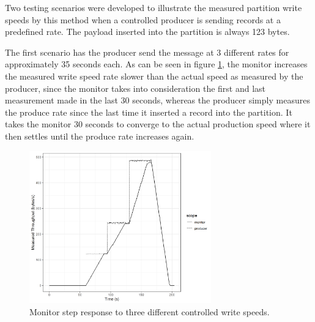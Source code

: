 Two testing scenarios were developed to illustrate the measured partition write
speeds by this method when a controlled producer is sending records at a
predefined rate. The payload inserted into the partition is always 123 bytes.

The first scenario has the producer send the message at 3 different rates for
approximately 35 seconds each. As can be seen in figure \ref{fig:monitor_step},
the monitor increases the measured write speed rate slower than the actual speed
as measured by the producer, since the monitor takes into consideration the
first and last measurement made in the last 30 seconds, whereas the producer
simply measures the produce rate since the last time it inserted a record into
the partition. It takes the monitor 30 seconds to converge to the actual
production speed where it then settles until the produce rate increases again.

\begin{figure}[htb!] 
    \centering
    \includegraphics[width=0.7\textwidth]{images/monitor/step.png}
    \caption{Monitor step response to three different controlled write speeds.}
    \label{fig:monitor_step} 
\end{figure}

